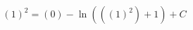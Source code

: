 \documentclass[preview]{standalone}
\begin{document}
\begin{align*}
{ \left(1\right) }^{2} = \left( 0 \right) - \ln \left( \left( { \left(1\right) }^{2} \right) + 1 \right) + C
\end{align*}
\end{document}
